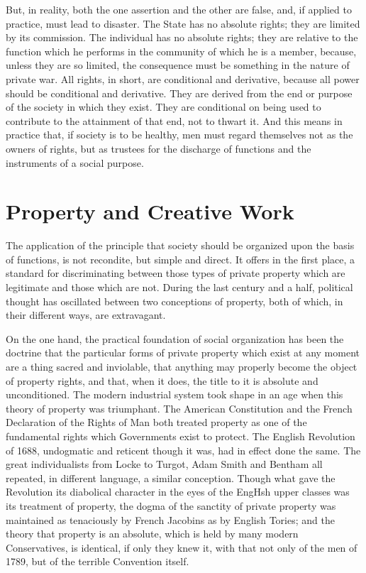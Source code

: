 \documentclass{book}
\begin{document}
But, in reality, both the one assertion and the other are false, and, if applied to practice, must lead to disaster. The State has no absolute rights; they are limited by its commission. The individual has no absolute rights; they are relative to the function which he performs in the community of which he is a member, because, unless they are so limited, the consequence must be something in the nature of private war. All rights, in short, are conditional and derivative, because all power should be conditional and derivative. They are derived from the end or purpose of the society in which they exist. They are conditional on being used to contribute to the attainment of that end, not to thwart it. And this means in practice that, if society is to be healthy, men must regard themselves not as the owners of rights, but as trustees for the discharge of functions and the instruments of a social purpose.

\chapter{Property and Creative Work}
\label{chapter-4}
The application of the principle that society should be organized upon the basis of functions, is not recondite, but simple and direct. It offers in the first place, a standard for discriminating between those types of private property which are legitimate and those which are not. During the last century and a half, political thought has oscillated between two conceptions of property, both of which, in their different ways, are extravagant.

On the one hand, the practical foundation of social organization has been the doctrine that the particular forms of private property which exist at any moment are a thing sacred and inviolable, that anything may properly become the object of property rights, and that, when it does, the title to it is absolute and unconditioned. The modern industrial system took shape in an age when this theory of property was triumphant. The American Constitution and the French Declaration of the Rights of Man both treated property as one of the fundamental rights which Governments exist to protect. The English Revolution of 1688, undogmatic and reticent though it was, had in effect done the same. The great individualists from Locke to Turgot, Adam Smith and Bentham all repeated, in different language, a similar conception. Though what gave the Revolution its diabolical character in the eyes of the EngHsh upper classes was its treatment of property, the dogma of the sanctity of private property was maintained as tenaciously by French Jacobins as by English Tories; and the theory that property is an absolute, which is held by many modern Conservatives, is identical, if only they knew it, with that not only of the men of 1789, but of the terrible Convention itself.
\end{document}
